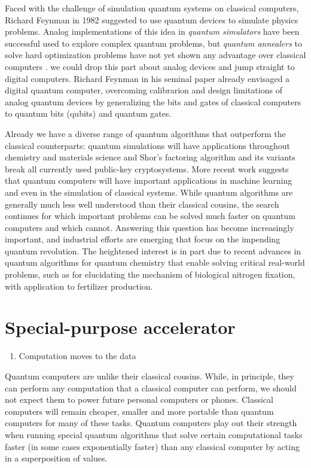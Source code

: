 \documentclass[journal]{IEEEtran}
\begin{document}
Faced with the challenge of simulation quantum systems on classical computers, Richard Feynman in 1982 \cite{Feynman1982} suggested to use quantum devices to simulate physics problems. Analog implementations of this idea in {\em quantum simulators }  \cite{RevModPhys.86.153}  have  been successful used to explore complex quantum problems, but {\em quantum annealers} to solve hard optimization problems have not  yet shown any advantage over classical computers \cite{speedup}. {\color{red} we could drop this part about analog devices and jump straight to digital computers.}  Richard Feynman \cite{Feynman1982} in his seminal paper already envisaged a digital quantum computer, overcoming calibrarion and design limitations of analog quantum devices by generalizing the bits and gates of classical computers to quantum bits (qubits) and quantum gates.

Already we have a diverse range of quantum algorithms that outperform the classical counterparts: quantum simulations will have applications throughout chemistry and materials science and Shor's factoring algorithm \cite{Shor1994} and its variants break all currently used public-key cryptosystems.  More recent work suggests that quantum computers will have important applications in machine learning and even in the simulation of classical systems. While quantum algorithms are generally much less well understood than their classical cousins, the search continues for which important problems can be solved much faster on quantum computers and which cannot. Answering this question has become increasingly important, and industrial efforts are emerging that focus on the impending quantum revolution. The heightened interest is in part due to recent advances in quantum algorithms for quantum chemistry that enable solving critical real-world problems, such as for elucidating the mechanism of biological nitrogen fixation, with application to fertilizer production.


\section{Special-purpose accelerator }
\begin{enumerate}
\item       Computation moves to the data
\end{enumerate}



Quantum computers are unlike their classical cousins.  While, in principle,  they can perform any computation that a classical computer can perform, we should not expect them to power future personal computers or phones. Classical computers will remain cheaper, smaller and more portable than quantum computers for many of these tasks. Quantum computers play out their strength when running special quantum algorithms that solve certain computational tasks faster (in some cases exponentially faster) than any classical computer by acting in a superposition of values.  
\end{document}
